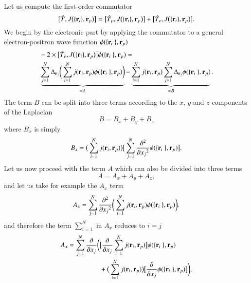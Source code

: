 \documentclass[aip,jcp,reprint,noshowkeys,superscriptaddress]{revtex4-1}
\newcommand{\deriv}[3]{\frac{\partial^{#3} #1}{\partial {#2}^{#3}}}
\newcommand{\bri}[1]{{\bf r}_{#1}}
\begin{document}
Let us compute the first-order commutator 
\begin{equation}
 \big[\hat{T},J\big(\{\bri{i} \},\bri{p}\big)\big]  = \big[\hat{T}_p,J\big(\{\bri{i} \},\bri{p}\big)\big]  
                                                    + \big[\hat{T}_e,J\big(\{\bri{i} \},\bri{p}\big)\big].
\end{equation}
We begin by the electronic part by applying the commutator to a general electron-positron wave function $\phi(\{ \bri{i} \},\bri{p})$ 
\begin{equation}
 \begin{aligned}
 & -2 \times \big[\hat{T}_e,J\big(\{\bri{i} \},\bri{p}\big)\big] \phi(\{ \bri{i} \},\bri{p}) = \\ 
& \underbrace{\sum_{j=1}^{N} \Delta_{\bri{j}}  \bigg( \sum_{i=1}^N j(\bri{i},\bri{p}) \phi(\{ \bri{i} \},\bri{p})  \bigg)}_{=A} 
             - \underbrace{\sum_{i=1}^N j(\bri{i},\bri{p}) \sum_{j=1}^{N} \Delta_{\bri{j}} \phi(\{ \bri{i} \},\bri{p})}_{=B}.
 \end{aligned}
\end{equation}
The term $B$ can be split into three terms according to the $x$, $y$ and $z$ components of the Laplacian 
\begin{equation}
 B = B_x + B_y + B_z
\end{equation}
where $B_x$ is simply 
\begin{equation}
 B_x = \big(\sum_{i=1}^N j(\bri{i},\bri{p})\big) \big[\sum_{j=1}^N\deriv{}{x_j}{2} \phi(\{ \bri{i} \},\bri{p}) \big].
\end{equation}
Let us now proceed with the term $A$ which can also be divided into three terms
\begin{equation}
 A = A_x + A_y + A_z,
\end{equation}
and let us take for example the $A_x$ term 
\begin{equation}
 A_x = \sum_{j=1}^{N} \deriv{}{x_j}{2}  \bigg( \sum_{i=1}^N j(\bri{i},\bri{p}) \phi(\{ \bri{i} \},\bri{p})  \bigg).
\end{equation}
and therefore the term $\sum_{i=1}^N$ in $A_x$ reduces to $i=j$
\begin{equation}
 \begin{aligned}
 A_x  = \sum_{j=1}^{N} \deriv{}{x_j}{} \bigg( & \big[\deriv{}{x_j}{}\sum_{i=1}^Nj(\bri{i},\bri{p})\big] \phi(\{ \bri{i} \},\bri{p}) \\
 &+ \big(\sum_{i=1}^Nj(\bri{i},\bri{p})\big) \big[\deriv{}{x_j}{} \phi(\{ \bri{i} \},\bri{p}) \big]\bigg),
 \end{aligned}
\end{equation}
\end{document}
